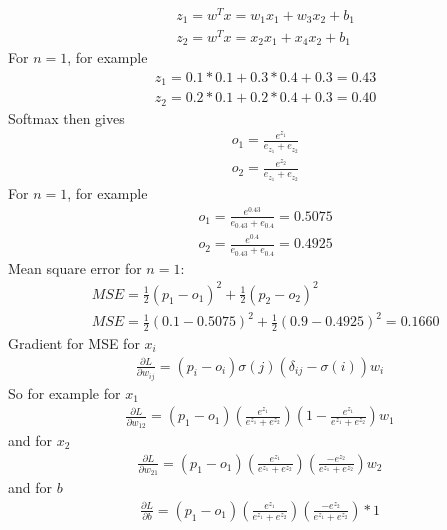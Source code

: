 \documentclass{article}
\begin{document}
\subsubsection{}
\begin{align*}
&	z_1 = w^Tx = w_1x_1 + w_3x_2 + b_1 \\
&	z_2 = w^Tx = x_2x_1 + x_4x_2 + b_1
\end{align*}
For $n=1$, for example
\begin{align*}
& z_1 = 0.1 * 0.1 + 0.3 * 0.4 + 0.3 = 0.43  \\
& z_2 = 0.2 * 0.1 + 0.2 * 0.4 + 0.3 = 0.40
\end{align*}
Softmax then gives
\begin{align*}
& o_1 = \frac{e^{z_1}}{e_{z_1} + e_{z_2}} \\
& o_2 = \frac{e^{z_2}}{e_{z_1} + e_{z_2}}
\end{align*}
For $n=1$, for example
\begin{align*}
& o_1 = \frac{e^{0.43}}{e_{0.43} + e_{0.4}} = 0.5075 \\
& o_2 = \frac{e^{0.4}}{e_{0.43} + e_{0.4}} = 0.4925
\end{align*}
Mean square error for $n=1$:
\begin{align*}
& MSE = \frac{1}{2}( p_1 - o_1)^2 + \frac{1}{2}(p_2 - o_2)^2 \\
& MSE = \frac{1}{2}(0.1 - 0.5075 )^2 + \frac{1}{2}( 0.9 - 0.4925)^2 = 0.1660
\end{align*}
Gradient for MSE for $x_i$
\begin{align*}
\frac{\partial L}{\partial w_{ij}} = (p_i - o_i) \sigma(j)(\delta_{ij} - \sigma(i)) w_i
\end{align*}
So for example for $x_1$ 
\begin{align*}
\frac{\partial L}{\partial w_{12}} = (p_1 - o_1) (\frac{e^{z_1}}{e^{z_1} + e^{z_2}}) (1 - \frac{e^{z_1}}{e^{z_1} + e^{z_2}}) w_1
\end{align*}
and for $x_2$ 
\begin{align*}
\frac{\partial L}{\partial w_{21}} = (p_1 - o_1) (\frac{e^{z_1}}{e^{z_1} + e^{z_2}}) (\frac{-e^{z_2}}{e^{z_1} + e^{z_2}}) w_2
\end{align*}
and for $b$ 
\begin{align*}
\frac{\partial L}{\partial b} = (p_1 - o_1) (\frac{e^{z_1}}{e^{z_1} + e^{z_2}}) (\frac{-e^{z_2}}{e^{z_1} + e^{z_2}})*1
\end{align*}
\end{document}
